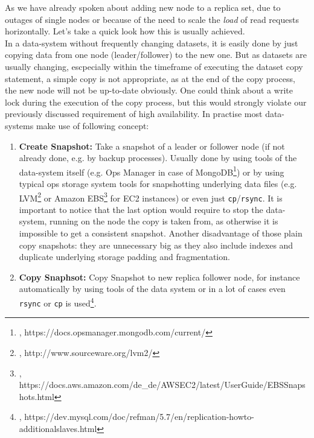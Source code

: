 {
As we have already spoken about adding new node to a replica set, due to outages of single nodes or because of the need to scale the \textit{load} of read requests horizontally. Let's take a quick look how this is usually achieved.\\
In a data-system without frequently changing datasets, it is easily done by just copying data from one node (leader/follower) to the new one. But as datasets are usually changing, escpecially within the timeframe of executing the dataset copy statement, a simple copy is not appropriate, as at the end of the copy process, the new node will not be up-to-date obviously. One could think about a write lock during the execution of the copy process, but this would strongly violate our previously discussed requirement of high availability. In practise most data-systems make use of following concept:\\
\begin{enumerate}
\item \textbf{Create Snapshot:} Take a snapshot of a leader or follower node (if not already done, e.g. by backup processes). Usually done by using tools of the data-system itself (e.g. Ops Manager in case of MongoDB\footnote{\cite{MDBOM}, https://docs.opsmanager.mongodb.com/current/}) or by using typical ops storage system tools for snapshotting underlying data files (e.g. LVM\footnote{\cite{LVM}, http://www.sourceware.org/lvm2/} or Amazon EBS\footnote{\cite{AMZEBS}, https://docs.aws.amazon.com/de\_de/AWSEC2/latest/UserGuide/EBSSnapshots.html} for EC2 instances) or even just \lstinline{cp}/\lstinline{rsync}. It is important to notice that the last option would require to stop the data-system, running on the node the copy is taken from, as otherwise it is impossible to get a consistent snapshot. Another disadvantage of those plain copy snapshots: they are unnecessary big as they also include indexes and duplicate underlying storage padding and fragmentation.
\item \textbf{Copy Snaphsot:} Copy Snapshot to new replica follower node, for instance automatically by using tools of the data system or in a lot of cases even \lstinline{rsync} or \lstinline{cp} is used\footnote{\cite{MYSQLNS}, https://dev.mysql.com/doc/refman/5.7/en/replication-howto-additionalslaves.html}.

\end{enumerate}}
